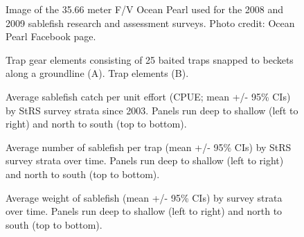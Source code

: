 \documentclass[12pt]{article}\usepackage[]{graphicx}\usepackage[]{color}
\begin{document}
\begin{figure}[htb]

{\centering {} 

}

\caption{Image of the 35.66 meter F/V Ocean Pearl used for the 2008 and 2009 sablefish research and assessment surveys. Photo credit: Ocean Pearl Facebook page.}\label{fig:figure5}
\end{figure}
\clearpage


\begin{figure}[htb]

{\centering {} 

}

\caption{Trap gear elements consisting of 25 baited traps snapped to beckets along a groundline (A). Trap elements (B).}\label{fig:figure6}
\end{figure}
\clearpage


\begin{figure}[htb]

{\centering {} 

}

\caption{Average sablefish catch per unit effort (CPUE; mean +/- 95\% CIs) by StRS survey strata since 2003. Panels run deep to shallow (left to right) and north to south (top to bottom).}\label{fig:figure7}
\end{figure}
\clearpage


\begin{figure}[htb]

{\centering {} 

}

\caption{Average number of sablefish per trap (mean +/- 95\% CIs) by StRS survey strata over time. Panels run deep to shallow (left to right) and north to south (top to bottom).}\label{fig:figure8}
\end{figure}
\clearpage


\begin{figure}[htb]

{\centering {} 

}

\caption{Average weight of sablefish (mean +/- 95\% CIs) by survey strata over time. Panels run deep to shallow (left to right) and north to south (top to bottom).}\label{fig:figure9}
\end{figure}
\clearpage
\end{document}
